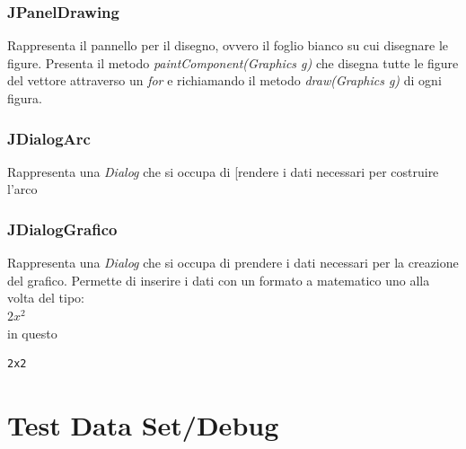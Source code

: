 \documentclass[a4paper,12pt,times,numbered,print,index]{article}
\begin{document}
\subsubsection{JPanelDrawing}
Rappresenta il pannello per il disegno, ovvero il foglio bianco su cui disegnare le figure. Presenta il metodo \textit{paintComponent(Graphics g)} che disegna tutte le figure del vettore attraverso un \textit{for} e richiamando il metodo \textit{draw(Graphics g)} di ogni figura.
\subsubsection{JDialogArc}
Rappresenta una \textit{Dialog} che si occupa di [rendere i dati necessari per costruire l'arco 
\subsubsection{JDialogGrafico}
Rappresenta una \textit{Dialog} che si occupa di prendere i dati necessari per la creazione del grafico. Permette di inserire i dati con un formato a matematico uno alla volta del tipo:\\
$2x^2$\\
in questo
\begin{lstlisting}
2x2
\end{lstlisting}

\section{Test Data Set/Debug}

\printbibliography
\end{document}
